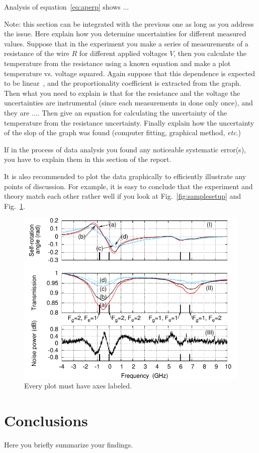 \documentclass[letterpaper,12pt]{article}
\begin{document}
Analysis of equation~\ref{eq:aperp} shows ...

Note: this section can be integrated with the previous one as long as you
address the issue. Here explain how you determine uncertainties for different
measured values. Suppose that in the experiment you make a series of
measurements of a resistance of the wire $R$ for different applied voltages
$V$, then you calculate the temperature from the resistance using a known
equation and make a plot  temperature vs. voltage squared. Again suppose that
this dependence is expected to be linear~\cite{Cyr}, and the proportionality coefficient
is extracted from the graph. Then what you need to explain is that for the
resistance and the voltage the uncertainties are instrumental (since each
measurements in done only once), and they are $\dots$. Then give an equation
for calculating the uncertainty of the temperature from the resistance
uncertainty. Finally explain how the uncertainty of the slop of the graph was
found (computer fitting, graphical method, \emph{etc}.)

If in the process of data analysis you found any noticeable systematic
error(s), you have to explain them in this section of the report.

It is also recommended to plot the data graphically to efficiently illustrate
any points of discussion. For example, it is easy to conclude that the
experiment and theory match each other rather well if you look at
Fig.~\ref{fig:samplesetup} and Fig.~\ref{fig:exp_plots}.

\begin{figure}[ht] 
  \centering
      \includegraphics[width=0.5\columnwidth]{sr_squeezing_vs_detuning}

        \caption{
                \label{fig:exp_plots}  
                Every plot must have axes labeled.
        }
\end{figure}


\section{Conclusions}
Here you briefly summarize your findings.
\end{document}
